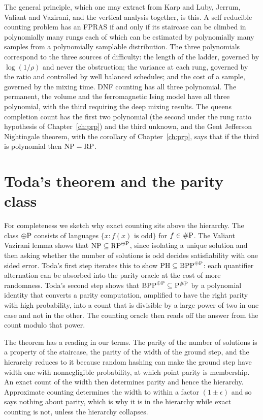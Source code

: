The general principle, which one may extract from Karp and Luby, Jerrum, Valiant and Vazirani, and the vertical analysis together, is this. A self reducible counting problem has an FPRAS if and only if its staircase can be climbed in polynomially many rungs each of which can be estimated by polynomially many samples from a polynomially samplable distribution. The three polynomials correspond to the three sources of difficulty: the length of the ladder, governed by $\log(1/\rho)$ and never the obstruction; the variance at each rung, governed by the ratio and controlled by well balanced schedules; and the cost of a sample, governed by the mixing time. DNF counting has all three polynomial. The permanent, the volume and the ferromagnetic Ising model have all three polynomial, with the third requiring the deep mixing results. The queens completion count has the first two polynomial (the second under the rung ratio hypothesis of Chapter~\ref{ch:prp}) and the third unknown, and the Gent Jefferson Nightingale theorem, with the corollary of Chapter~\ref{ch:prp}, says that if the third is polynomial then $\mathrm{NP} = \mathrm{RP}$.

\section{Toda's theorem and the parity class}

For completeness we sketch why exact counting sits above the hierarchy. The class $\oplus\mathrm{P}$ consists of languages $\{ x : f(x) \text{ is odd} \}$ for $f \in \#\mathrm{P}$. The Valiant Vazirani lemma shows that $\mathrm{NP} \subseteq \mathrm{RP}^{\oplus\mathrm{P}}$, since isolating a unique solution and then asking whether the number of solutions is odd decides satisfiability with one sided error. Toda's first step iterates this to show $\mathrm{PH} \subseteq \mathrm{BPP}^{\oplus\mathrm{P}}$: each quantifier alternation can be absorbed into the parity oracle at the cost of more randomness. Toda's second step shows that $\mathrm{BPP}^{\oplus\mathrm{P}} \subseteq \mathrm{P}^{\#\mathrm{P}}$ by a polynomial identity that converts a parity computation, amplified to have the right parity with high probability, into a count that is divisible by a large power of two in one case and not in the other. The counting oracle then reads off the answer from the count modulo that power.

The theorem has a reading in our terms. The parity of the number of solutions is a property of the staircase, the parity of the width of the ground step, and the hierarchy reduces to it because random hashing can make the ground step have width one with nonnegligible probability, at which point parity is membership. An exact count of the width then determines parity and hence the hierarchy. Approximate counting determines the width to within a factor $(1 \pm \epsilon)$ and so says nothing about parity, which is why it is in the hierarchy while exact counting is not, unless the hierarchy collapses.

